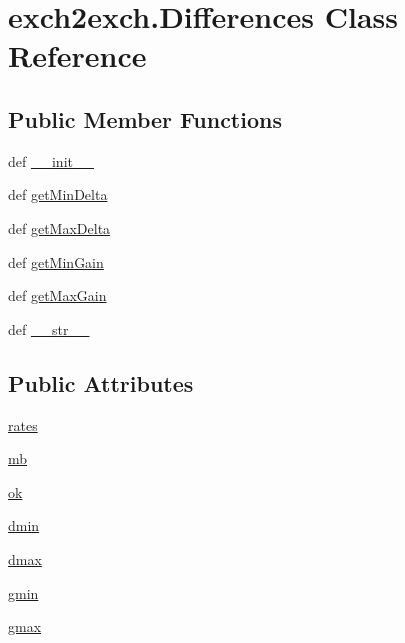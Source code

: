 \hypertarget{classexch2exch_1_1_differences}{\section{exch2exch.\-Differences Class Reference}
\label{classexch2exch_1_1_differences}
}
\subsection*{Public Member Functions}
\begin{DoxyCompactItemize}
\item 
def \hyperlink{classexch2exch_1_1_differences_a233d3aa10e3542a0d8229b299384b2b8}{\-\_\-\-\_\-init\-\_\-\-\_\-}
\item 
def \hyperlink{classexch2exch_1_1_differences_ae6156c3361371d1688de9b334ef7dc8d}{get\-Min\-Delta}
\item 
def \hyperlink{classexch2exch_1_1_differences_a3083b0bcc349937fb7ad708bc683e3d4}{get\-Max\-Delta}
\item 
def \hyperlink{classexch2exch_1_1_differences_a3c7fc587dedfda0e303260f244021017}{get\-Min\-Gain}
\item 
def \hyperlink{classexch2exch_1_1_differences_a83359c7999d33257746aa09f653e41fa}{get\-Max\-Gain}
\item 
def \hyperlink{classexch2exch_1_1_differences_a4dbc60a284d9679bb9682d46112ee1bf}{\-\_\-\-\_\-str\-\_\-\-\_\-}
\end{DoxyCompactItemize}
\subsection*{Public Attributes}
\begin{DoxyCompactItemize}
\item 
\hyperlink{classexch2exch_1_1_differences_a64aec2fc7f20028f0bd834908cbea116}{rates}
\item 
\hyperlink{classexch2exch_1_1_differences_a81c81e9c15b5ea8a5d39bb99d85250e1}{mb}
\item 
\hyperlink{classexch2exch_1_1_differences_a6de3ee563584c83a97ba815db8ec7831}{ok}
\item 
\hyperlink{classexch2exch_1_1_differences_a7825bfca16b5775aa770c8810412b215}{dmin}
\item 
\hyperlink{classexch2exch_1_1_differences_a261a74cc25d77b2608898fa5611f9f0b}{dmax}
\item 
\hyperlink{classexch2exch_1_1_differences_a33c9add531b5b46c49ae322657343382}{gmin}
\item 
\hyperlink{classexch2exch_1_1_differences_a569f2a6fa0e33ad725c3c3ada259ddcc}{gmax}
\end{DoxyCompactItemize}


